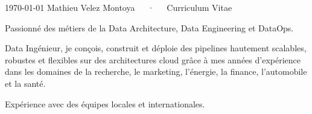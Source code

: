 \documentclass[11pt, a4paper]{awesome-cv}
\begin{document}
\makecvheader

\makecvfooter
{\today}
{Mathieu Velez Montoya~~~·~~~Curriculum Vitae}
{}


\begin{cvparagraph}
	Passionné des métiers de la Data Architecture, Data Engineering et DataOps.

	Data Ingénieur, je conçois, construit et déploie des pipelines hautement scalables, robustes et flexibles sur des architectures cloud grâce à mes années d'expérience dans les domaines de la recherche,
	le marketing, l'énergie, la finance, l'automobile et la santé.

	Expérience avec des équipes locales et internationales.
\end{cvparagraph}





\end{document}
